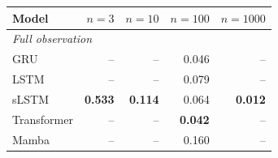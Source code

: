 \begin{tabular}{lrrrr}
\toprule
Model & $n{=}3$ & $n{=}10$ & $n{=}100$ & $n{=}1000$ \\
\midrule
\multicolumn{5}{l}{\emph{Full observation}} \\
GRU & -- & -- & 0.046 & -- \\
LSTM & -- & -- & 0.079 & -- \\
sLSTM & \textbf{0.533} & \textbf{0.114} & 0.064 & \textbf{0.012} \\
Transformer & -- & -- & \textbf{0.042} & -- \\
Mamba & -- & -- & 0.160 & -- \\
\bottomrule
\end{tabular}
